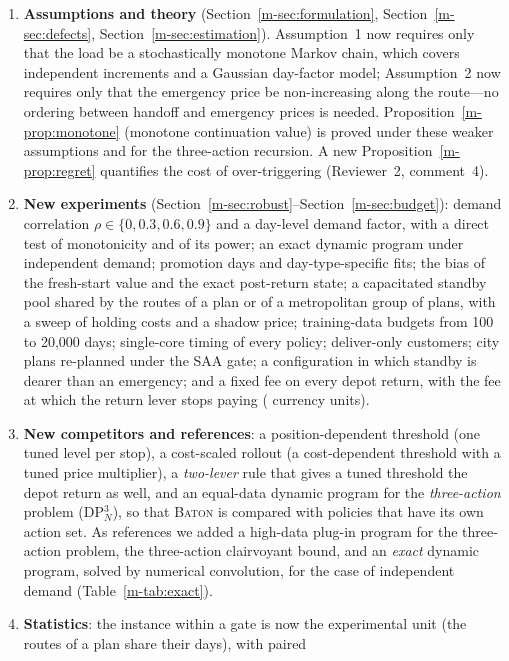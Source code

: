 \documentclass[11pt]{article}
\newcommand{\sref}[1]{Section~\ref{m-#1}}
\newcommand{\tref}[1]{Table~\ref{m-#1}}
\newcommand{\BATON}{\textsc{Baton}}
\begin{document}
\begin{enumerate}[leftmargin=1.4em]
\item \textbf{Assumptions and theory} (\sref{sec:formulation},
  \sref{sec:defects}, \sref{sec:estimation}). Assumption~1 now requires
  only that the load be a stochastically monotone Markov chain, which
  covers independent increments and a Gaussian day-factor model;
  Assumption~2 now requires only that the emergency price be
  non-increasing along the route---no ordering between handoff and
  emergency prices is needed. Proposition~\ref{m-prop:monotone}
  (monotone continuation value) is proved under these weaker assumptions
  and for the three-action recursion. A new
  Proposition~\ref{m-prop:regret} quantifies the cost of over-triggering
  (Reviewer~2, comment~4).
\item \textbf{New experiments} (\sref{sec:robust}--\sref{sec:budget}):
  demand correlation $\rho \in \{0, 0.3, 0.6, 0.9\}$ and a day-level
  demand factor, with a direct test of monotonicity and of its power;
  an exact dynamic program under independent demand; promotion days and
  day-type-specific fits; the bias of the fresh-start value and the
  exact post-return state; a capacitated standby pool shared by the
  routes of a plan or of a metropolitan group of plans, with a sweep of
  holding costs and a shadow price;
  training-data budgets from 100 to 20{,}000 days; single-core timing of
  every policy; deliver-only customers; city plans re-planned under the
  \textsc{SAA} gate; a configuration in which standby is dearer than an
  emergency; and a fixed fee on every depot return, with the fee at which
  the return lever stops paying (\feeBreakEven{} currency units).
\item \textbf{New competitors and references}: a position-dependent
  threshold (one tuned level per stop), a cost-scaled rollout (a
  cost-dependent threshold with a tuned price multiplier), a
  \emph{two-lever} rule that gives a tuned threshold the depot return as
  well, and an equal-data dynamic program for the \emph{three-action}
  problem (DP$^3_N$), so that \BATON{} is compared with policies that
  have its own action set. As references we added a high-data plug-in
  program for the three-action problem, the three-action clairvoyant
  bound, and an \emph{exact} dynamic program, solved by numerical
  convolution, for the case of independent demand
  (\tref{tab:exact}).
\item \textbf{Statistics}: the instance within a gate is now the
  experimental unit (the routes of a plan share their days), with paired

\end{enumerate}
\end{document}
